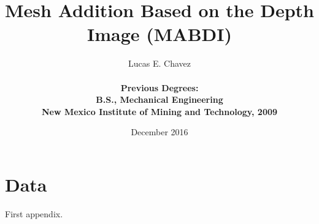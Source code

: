 \documentclass{eeceTR}
\date{December 2016}
\title{Mesh Addition Based on the Depth Image (MABDI)}
\author{Lucas E. Chavez \\ \\
\bf{Previous Degrees:} \\
B.S., Mechanical Engineering \\
New Mexico Institute of Mining and Technology, 2009\\
}
\begin{document}
\maketitle
\makeabstract

\tableofcontents
\pagebreak














\appendix

\section{Data}
First appendix.



\end{document}
